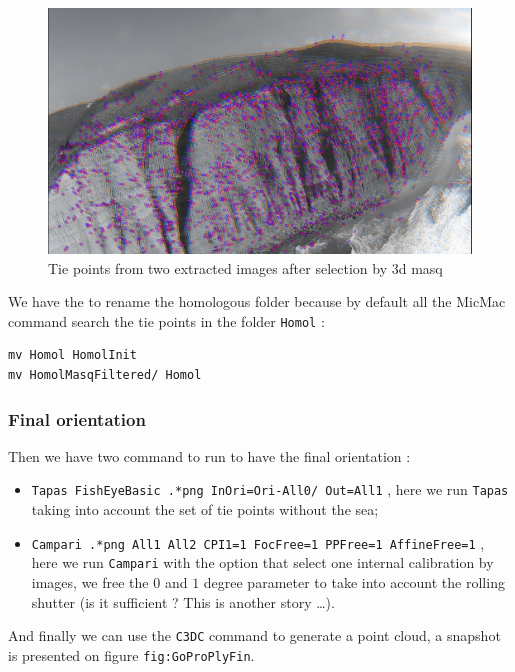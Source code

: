 \begin{figure}
\centering
\includegraphics[width=0.90\linewidth]{FIGS/GoProVideo/SIFT2.jpg}
\caption{Tie points from  two extracted images after selection by $3$d masq}
\label{fig:GoProSIFT2}
\end{figure}

We have the to rename the homologous folder because by default all the MicMac command search the tie points 
in the folder {\tt Homol} :

\begin{verbatim}
mv Homol HomolInit
mv HomolMasqFiltered/ Homol
\end{verbatim}

\subsubsection{Final orientation}

Then we have two command to run to have the final orientation :


\begin{itemize}
   \item {\tt Tapas   FishEyeBasic .*png InOri=Ori-All0/ Out=All1} , here we run {\tt Tapas} taking into account
         the set of tie points without the sea;

   \item {\tt Campari  .*png  All1 All2 CPI1=1 FocFree=1 PPFree=1 AffineFree=1} , here we run {\tt Campari} with the option
         that select one internal calibration by images, we free the $0$ and $1$ degree parameter to take into account the
          rolling shutter (is it sufficient ? This is another story \dots).
\end{itemize}

And finally we can use the {\tt C3DC} command to generate a point cloud, a snapshot is presented on figure {\tt fig:GoProPlyFin}.

